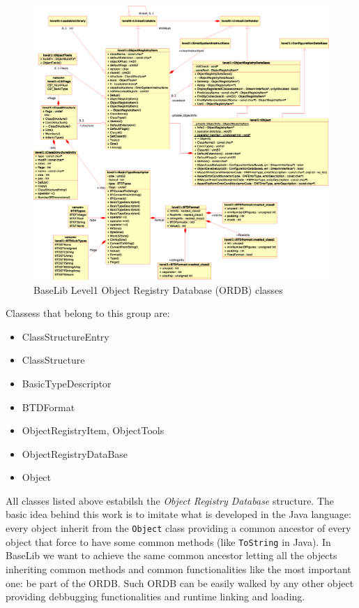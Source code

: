 \begin{figure}[h!]
 \begin{center}
  \includegraphics[width=\textwidth]{level1/level1-object.eps}
  \caption{BaseLib Level1 Object Registry Database (ORDB) classes}
  \label{f:level1:object}
 \end{center}
\end{figure}

Classess that belong to this group are:
\begin{itemize}
 \item ClassStructureEntry
 \item ClassStructure

 \item BasicTypeDescriptor
 \item BTDFormat

 \item ObjectRegistryItem, ObjectTools
 \item ObjectRegistryDataBase
 \item Object
\end{itemize}

All classes listed above estabilsh the \textit{Object Registry Database} structure. The basic idea behind this work is to imitate what is developed in the Java language: every object inherit from the \texttt{Object} class providing a common ancestor of every object that force to have some common methods (like \texttt{ToString} in Java).
In BaseLib we want to achieve the same common ancestor letting all the objects inheriting common methods and common functionalities like the most important one: be part of the ORDB. Such ORDB can be easily walked by any other object providing debbugging functionalities and runtime linking and loading. \\


